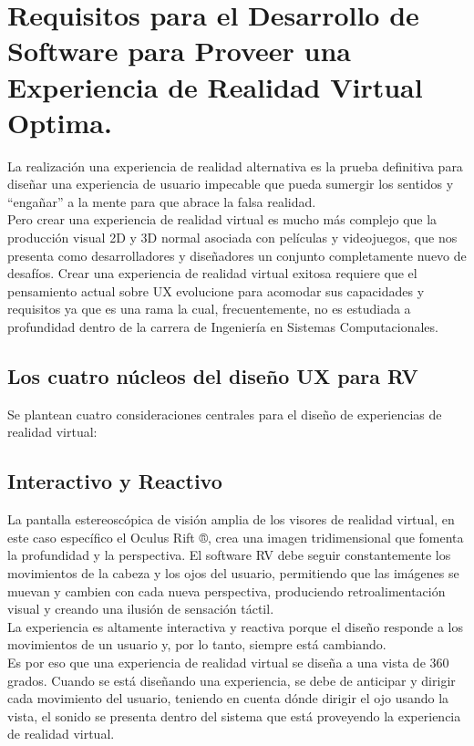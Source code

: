 \section{Requisitos para el Desarrollo de Software para Proveer una Experiencia de Realidad Virtual Optima.}
La realización una experiencia de realidad alternativa es la prueba definitiva para diseñar una experiencia de usuario impecable que pueda sumergir los sentidos y 
“engañar” a la mente para que abrace la falsa realidad. \\
Pero crear una experiencia de realidad virtual es mucho más complejo que la producción visual 2D y 3D normal asociada con películas y videojuegos, que nos presenta 
como desarrolladores y diseñadores un conjunto completamente nuevo de desafíos. Crear una experiencia de realidad virtual exitosa requiere que el pensamiento actual 
sobre UX evolucione para acomodar sus capacidades y requisitos ya que es una rama la cual, frecuentemente, no es estudiada a profundidad dentro de la carrera de 
Ingeniería en Sistemas Computacionales. 

\subsection{Los cuatro núcleos del diseño UX para RV}
Se plantean cuatro consideraciones centrales para el diseño de experiencias de realidad virtual:\\

\subsection{Interactivo y Reactivo}
La pantalla estereoscópica de visión amplia de los visores de realidad virtual, en este caso específico el Oculus Rift ®,  crea una imagen tridimensional que fomenta 
la profundidad y la perspectiva. El software RV debe seguir constantemente los movimientos de la cabeza y los ojos del usuario, permitiendo que las imágenes se muevan 
y cambien con cada nueva perspectiva, produciendo retroalimentación visual y creando una ilusión de sensación táctil.\\
La experiencia es altamente interactiva y reactiva porque el diseño responde a los movimientos de un usuario y, por lo tanto, siempre está cambiando.\\
Es por eso que una experiencia de realidad virtual se diseña a una vista de 360 grados. Cuando se está diseñando una experiencia, se debe de anticipar y dirigir cada 
movimiento del usuario, teniendo en cuenta dónde dirigir el ojo usando la vista, el sonido se presenta dentro del sistema que está proveyendo la experiencia de realidad virtual.

